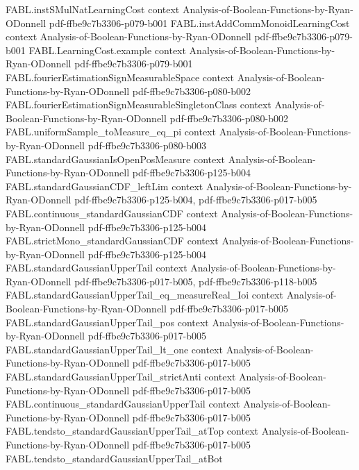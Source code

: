 \begin{theorem}
\proofstep
  {FABL.instSMulNatLearningCost}
  {context}
  {Analysis-of-Boolean-Functions-by-Ryan-ODonnell}
  {pdf-ffbe9c7b3306-p079-b001}
\proofstep
  {FABL.instAddCommMonoidLearningCost}
  {context}
  {Analysis-of-Boolean-Functions-by-Ryan-ODonnell}
  {pdf-ffbe9c7b3306-p079-b001}
\proofstep
  {FABL.LearningCost.example}
  {context}
  {Analysis-of-Boolean-Functions-by-Ryan-ODonnell}
  {pdf-ffbe9c7b3306-p079-b001}
\proofstep
  {FABL.fourierEstimationSignMeasurableSpace}
  {context}
  {Analysis-of-Boolean-Functions-by-Ryan-ODonnell}
  {pdf-ffbe9c7b3306-p080-b002}
\proofstep
  {FABL.fourierEstimationSignMeasurableSingletonClass}
  {context}
  {Analysis-of-Boolean-Functions-by-Ryan-ODonnell}
  {pdf-ffbe9c7b3306-p080-b002}
\proofstep
  {FABL.uniformSample_toMeasure_eq_pi}
  {context}
  {Analysis-of-Boolean-Functions-by-Ryan-ODonnell}
  {pdf-ffbe9c7b3306-p080-b003}
\proofstep
  {FABL.standardGaussianIsOpenPosMeasure}
  {context}
  {Analysis-of-Boolean-Functions-by-Ryan-ODonnell}
  {pdf-ffbe9c7b3306-p125-b004}
\proofstep
  {FABL.standardGaussianCDF_leftLim}
  {context}
  {Analysis-of-Boolean-Functions-by-Ryan-ODonnell}
  {pdf-ffbe9c7b3306-p125-b004,
    pdf-ffbe9c7b3306-p017-b005}
\proofstep
  {FABL.continuous_standardGaussianCDF}
  {context}
  {Analysis-of-Boolean-Functions-by-Ryan-ODonnell}
  {pdf-ffbe9c7b3306-p125-b004}
\proofstep
  {FABL.strictMono_standardGaussianCDF}
  {context}
  {Analysis-of-Boolean-Functions-by-Ryan-ODonnell}
  {pdf-ffbe9c7b3306-p125-b004}
\proofstep
  {FABL.standardGaussianUpperTail}
  {context}
  {Analysis-of-Boolean-Functions-by-Ryan-ODonnell}
  {pdf-ffbe9c7b3306-p017-b005,
    pdf-ffbe9c7b3306-p118-b005}
\proofstep
  {FABL.standardGaussianUpperTail_eq_measureReal_Ioi}
  {context}
  {Analysis-of-Boolean-Functions-by-Ryan-ODonnell}
  {pdf-ffbe9c7b3306-p017-b005}
\proofstep
  {FABL.standardGaussianUpperTail_pos}
  {context}
  {Analysis-of-Boolean-Functions-by-Ryan-ODonnell}
  {pdf-ffbe9c7b3306-p017-b005}
\proofstep
  {FABL.standardGaussianUpperTail_lt_one}
  {context}
  {Analysis-of-Boolean-Functions-by-Ryan-ODonnell}
  {pdf-ffbe9c7b3306-p017-b005}
\proofstep
  {FABL.standardGaussianUpperTail_strictAnti}
  {context}
  {Analysis-of-Boolean-Functions-by-Ryan-ODonnell}
  {pdf-ffbe9c7b3306-p017-b005}
\proofstep
  {FABL.continuous_standardGaussianUpperTail}
  {context}
  {Analysis-of-Boolean-Functions-by-Ryan-ODonnell}
  {pdf-ffbe9c7b3306-p017-b005}
\proofstep
  {FABL.tendsto_standardGaussianUpperTail_atTop}
  {context}
  {Analysis-of-Boolean-Functions-by-Ryan-ODonnell}
  {pdf-ffbe9c7b3306-p017-b005}
\proofstep
  {FABL.tendsto_standardGaussianUpperTail_atBot}

\end{theorem}
